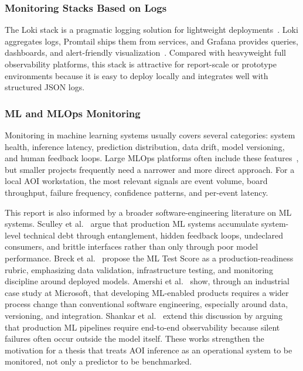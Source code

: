 \documentclass[12pt,a4paper]{article}
\begin{document}
\subsubsection{Monitoring Stacks Based on Logs}
The Loki stack is a pragmatic logging solution for lightweight deployments~\cite{loki}.
Loki aggregates logs, Promtail ships them from services, and Grafana provides
queries, dashboards, and alert-friendly visualization~\cite{turnbull2018grafana}. Compared with heavyweight
full observability platforms, this stack is attractive for report-scale or
prototype environments because it is easy to deploy locally and integrates well
with structured JSON logs.

\subsubsection{ML and MLOps Monitoring}
Monitoring in machine learning systems usually covers several categories:
system health, inference latency, prediction distribution, data drift, model
versioning, and human feedback loops. Large MLOps platforms often include these
features~\cite{mlops}, but smaller projects frequently need a narrower and more direct
approach. For a local AOI workstation, the most relevant signals are event
volume, board throughput, failure frequency, confidence patterns, and per-event
latency.

This report is also informed by a broader software-engineering literature on ML
systems. Sculley et al.~\cite{sculley2015debt} argue that production ML systems accumulate system-level
technical debt through entanglement, hidden feedback loops, undeclared
consumers, and brittle interfaces rather than only through poor model
performance. Breck et al.~\cite{breck2017mltestscore} propose the ML Test Score as a production-readiness
rubric, emphasizing data validation, infrastructure testing, and monitoring
discipline around deployed models. Amershi et al.~\cite{amershi2019case} show, through an industrial
case study at Microsoft, that developing ML-enabled products requires a wider
process change than conventional software engineering, especially around data,
versioning, and integration. Shankar et al.~\cite{shankar2022observability, shankar2022interview} extend this discussion by arguing
that production ML pipelines require end-to-end observability because silent
failures often occur outside the model itself. These works strengthen the
motivation for a thesis that treats AOI inference as an operational system to
be monitored, not only a predictor to be benchmarked.
\end{document}

